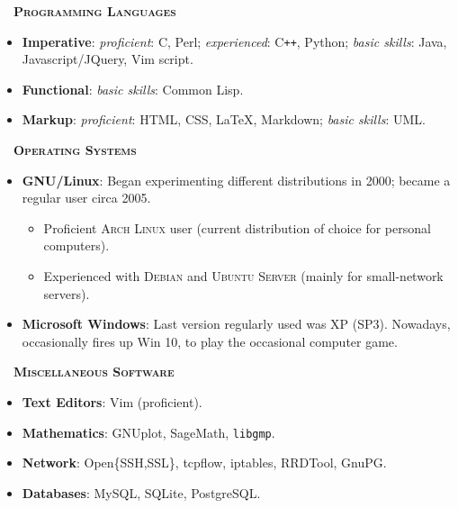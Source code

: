 \documentclass[a4paper,10pt]{extarticle}
\newenvironment{topic}[1]
   {{\noindent\large\bfseries\raisebox{0pt}[\height][1ex]{#1}\hrule\par}%
    \begin{list}{}{%
       \setlength{\leftmargin}{.0cm}}\item[]}
   {\end{list}\medskip}
\begin{document}
\begin{topic}{Technical Skills}
  {\rhd\ \ \bfseries \scshape Programming Languages}  
  \begin{itemize}[leftmargin=*]
    \item{\bfseries Imperative}: \emph{proficient}: C, Perl; \emph{experienced}: C{}\verb!++!, Python;
      \emph{basic skills}: Java, Javascript/JQuery, Vim script.
    \item{\bfseries Functional}: \emph{basic skills}: Common Lisp.
    \item{\bfseries Markup}: \emph{proficient}: HTML, CSS, \LaTeX, Markdown; \emph{basic skills}: UML.
  \end{itemize}
  {\rhd\ \ \bfseries \scshape Operating Systems} 
  \begin{itemize}[leftmargin=*]
		\item{\bfseries GNU/Linux}: Began experimenting different distributions in 
			2000; became a regular user circa 2005.
      \begin{itemize}
				\item Proficient \textsc{Arch Linux} user (current distribution of choice for personal computers).
				\item Experienced with \textsc{Debian} and \textsc{Ubuntu Server} (mainly for small-network servers).
      \end{itemize}
		\item{\bfseries Microsoft Windows}: Last version regularly used was XP 
			(SP3). Nowadays, occasionally fires up Win 10, to play the occasional 
			computer game.
  \end{itemize}
	\newpage %
  {\rhd\ \ \bfseries \scshape Miscellaneous Software}\\[1em]
	\begin{minipage}{0.5\textwidth}
		\begin{itemize}
			\item{\bfseries Text Editors}: Vim (proficient).\\\phantom{xpto}
			\item{\bfseries Mathematics}: GNUplot, SageMath, 
				\texttt{libgmp}.
		\end{itemize}
	\end{minipage}%
	\begin{minipage}{0.5\textwidth}
		\begin{itemize}
			\item{\bfseries Network}: Open\{SSH,SSL\}, tcpflow, iptables, RRDTool, GnuPG.
			\item{\bfseries Databases}: MySQL, SQLite, PostgreSQL.
		\end{itemize}
	\end{minipage}
\end{topic}
\end{document}
